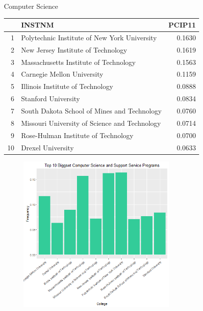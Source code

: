 \documentclass{article}
\begin{document}
\clearpage

Computer Science
\begin{table}[ht]
\centering
\begin{tabular}{rlr}
  \hline
 & INSTNM & PCIP11 \\ 
  \hline
1 & Polytechnic Institute of New York University & 0.1630 \\ 
  2 & New Jersey Institute of Technology & 0.1619 \\ 
  3 & Massachusetts Institute of Technology & 0.1563 \\ 
  4 & Carnegie Mellon University & 0.1159 \\ 
  5 & Illinois Institute of Technology & 0.0888 \\ 
  6 & Stanford University & 0.0834 \\ 
  7 & South Dakota School of Mines and Technology & 0.0760 \\ 
  8 & Missouri University of Science and Technology & 0.0714 \\ 
  9 & Rose-Hulman Institute of Technology & 0.0700 \\ 
  10 & Drexel University & 0.0633 \\ 
   \hline
\end{tabular}
\end{table}
\begin{figure}[H]
\includegraphics[width=0.7\textwidth]{../images/biggestCS.png}
\end{figure}

\clearpage
\end{document}
